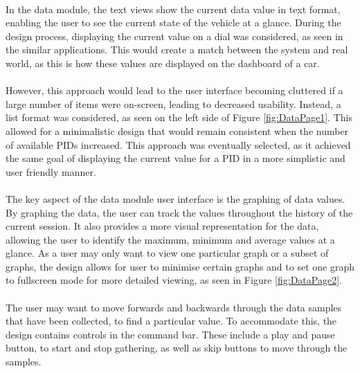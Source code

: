 		\paragraph{}{
		In the data module, the text views show the current data value in text format, enabling the user to see the current state of the vehicle at a glance. During the design process, displaying the current value on a dial was considered, as seen in the similar applications. This would create a match between the system and real world, as this is how these values are displayed on the dashboard of a car.
		}
		\paragraph{}{
		However, this approach would lead to the user interface becoming cluttered if a large number of items were on-screen, leading to decreased usability. Instead, a list format was considered, as seen on the left side of Figure \ref{fig:DataPage1}. This allowed for a minimalistic design that would remain consistent when the number of available PIDs increased. This approach was eventually selected, as it achieved the same goal of displaying the current value for a PID in a more simplistic and user friendly manner.
		}
		\paragraph{}{
		The key aspect of the data module user interface is the graphing of data values. By graphing the data, the user can track the values throughout the history of the current session. It also provides a more visual representation for the data, allowing the user to identify the maximum, minimum and average values at a glance. As a user may only want to view one particular graph or a subset of graphs, the design allows for user to minimise certain graphs and to set one graph to fullscreen mode for more detailed viewing, as seen in Figure \ref{fig:DataPage2}.
		}
		\paragraph{}{
		The user may want to move forwards and backwards through the data samples that have been collected, to find a particular value. To accommodate this, the design contains controls in the command bar. These include a play and pause button, to start and stop gathering, as well as skip buttons to move through the samples.
		}
		
